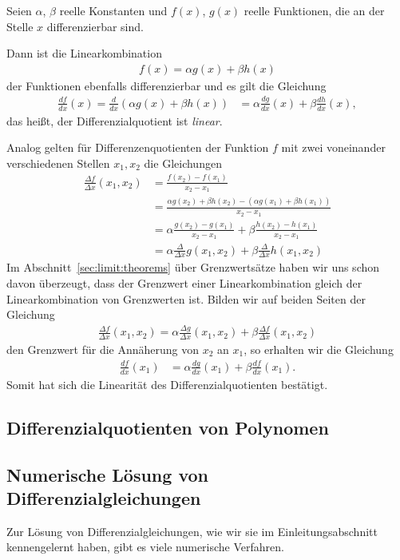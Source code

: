 \documentclass{article}
\def\ddx#1{\frac{d#1}{dx}}
\def\DDx#1{\frac{\Delta#1}{\Delta x}}
\begin{document}
Seien $\alpha$, $\beta$ reelle Konstanten und $f(x)$, $g(x)$ reelle
Funktionen, die an der Stelle $x$ differenzierbar sind.

Dann ist die Linearkombination
\begin{align*}
  f(x) = \alpha g(x) + \beta h(x)
\end{align*}
der Funktionen ebenfalls differenzierbar und es gilt die Gleichung
\begin{align*}
  \ddx f(x) = \ddx{}(\alpha g(x) + \beta h(x)) &= \alpha \ddx g(x) + \beta\ddx h(x),
\end{align*}
das heißt, der Differenzialquotient ist \emph{linear}.

Analog gelten für Differenzenquotienten der Funktion $f$ mit zwei
voneinander verschiedenen Stellen $x_1,x_2$ die Gleichungen
\begin{align*}
  \frac{\Delta f}{\Delta x}(x_1,x_2) &= \frac{f(x_2) - f(x_1)}{x_2-x_1}\\
                            &= \frac{\alpha g(x_2) + \beta h(x_2) - (\alpha g(x_1) + \beta h(x_1))}{x_2-x_1}\\
                            &= \alpha \frac{g(x_2) - g(x_1)}{x_2-x_1} + \beta \frac{h(x_2)- h(x_1)}{x_2-x_1}\\
                            &= \alpha\frac{\Delta}{\Delta x} g(x_1,x_2) + \beta\frac{\Delta}{\Delta x} h(x_1,x_2)
\end{align*}
Im Abschnitt~\ref{sec:limit:theorems} über Grenzwertsätze haben wir
uns schon davon überzeugt, dass der Grenzwert einer Linearkombination
gleich der Linearkombination von Grenzwerten ist. Bilden wir auf beiden Seiten der Gleichung
\begin{align*}
  \DDx f(x_1,x_2) = \alpha\DDx g(x_1,x_2) + \beta\DDx f(x_1,x_2)
\end{align*}
den Grenzwert für die Annäherung von $x_2$ an $x_1$, so erhalten wir die Gleichung
\begin{align*}
  \ddx f(x_1) &= \alpha \ddx g(x_1) + \beta\ddx f(x_1). 
\end{align*}
Somit hat sich die Linearität des Differenzialquotienten bestätigt.
\subsection{Differenzialquotienten von Polynomen}
\label{sec:poly:ddx}

\subsection{Numerische Lösung von Differenzialgleichungen}
Zur Lösung von Differenzialgleichungen, wie wir sie im
Einleitungsabschnitt kennengelernt haben, gibt es viele numerische
Verfahren.
\end{document}
